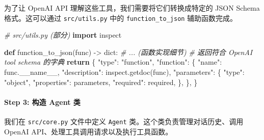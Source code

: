 \documentclass[
]{article}
\newenvironment{Shaded}{}{}
\newcommand{\BuiltInTok}[1]{\textcolor[rgb]{0.00,0.50,0.00}{#1}}
\newcommand{\CommentTok}[1]{\textcolor[rgb]{0.38,0.63,0.69}{\textit{#1}}}
\newcommand{\ControlFlowTok}[1]{\textcolor[rgb]{0.00,0.44,0.13}{\textbf{#1}}}
\newcommand{\ImportTok}[1]{\textcolor[rgb]{0.00,0.50,0.00}{\textbf{#1}}}
\newcommand{\KeywordTok}[1]{\textcolor[rgb]{0.00,0.44,0.13}{\textbf{#1}}}
\newcommand{\NormalTok}[1]{#1}
\newcommand{\OperatorTok}[1]{\textcolor[rgb]{0.40,0.40,0.40}{#1}}
\newcommand{\StringTok}[1]{\textcolor[rgb]{0.25,0.44,0.63}{#1}}
\newcommand{\VariableTok}[1]{\textcolor[rgb]{0.10,0.09,0.49}{#1}}
\begin{document}
为了让 OpenAI API 理解这些工具，我们需要将它们转换成特定的 JSON Schema
格式。这可以通过 \texttt{src/utils.py} 中的 \texttt{function\_to\_json}
辅助函数完成。

\begin{Shaded}
\begin{Highlighting}[]
\CommentTok{\# src/utils.py (部分)}
\ImportTok{import}\NormalTok{ inspect}

\KeywordTok{def}\NormalTok{ function\_to\_json(func) }\OperatorTok{{-}\textgreater{}} \BuiltInTok{dict}\NormalTok{:}
    \CommentTok{\# ... (函数实现细节)}
    \CommentTok{\# 返回符合 OpenAI tool schema 的字典}
    \ControlFlowTok{return}\NormalTok{ \{}
        \StringTok{"type"}\NormalTok{: }\StringTok{"function"}\NormalTok{,}
        \StringTok{"function"}\NormalTok{: \{}
            \StringTok{"name"}\NormalTok{: func.}\VariableTok{\_\_name\_\_}\NormalTok{,}
            \StringTok{"description"}\NormalTok{: inspect.getdoc(func),}
            \StringTok{"parameters"}\NormalTok{: \{}
                \StringTok{"type"}\NormalTok{: }\StringTok{"object"}\NormalTok{,}
                \StringTok{"properties"}\NormalTok{: parameters,}
                \StringTok{"required"}\NormalTok{: required,}
\NormalTok{            \},}
\NormalTok{        \},}
\NormalTok{    \}}
\end{Highlighting}
\end{Shaded}

\paragraph{Step 3: 构造 Agent
类}\label{step-3-ux6784ux9020-agent-ux7c7b}

我们在 \texttt{src/core.py} 文件中定义 \texttt{Agent}
类。这个类负责管理对话历史、调用 OpenAI
API、处理工具调用请求以及执行工具函数。
\end{document}
